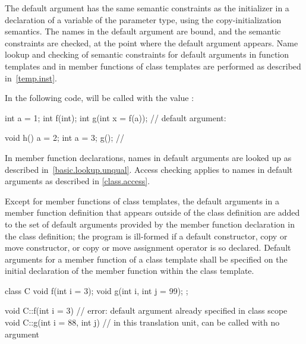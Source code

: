 \pnum
{}%
%
%
The default argument has the
same semantic constraints as the initializer in a
declaration of a variable of the parameter type, using the
copy-initialization semantics.
The names in the
default argument are bound, and the semantic constraints are checked,
at the point where the default argument appears.
Name lookup and checking of semantic constraints for default
arguments in function templates and in member functions of
class templates are performed as described in~\ref{temp.inst}.
\begin{example}
In the following code,
%
will be called with the value
:

\begin{codeblock}
int a = 1;
int f(int);
int g(int x = f(a));            // default argument: 

void h() {
  a = 2;
  {
  int a = 3;
  g();                          // 
  }
}
\end{codeblock}
\end{example}
\begin{note}
In member function declarations,
names in default arguments are looked up
as described in~\ref{basic.lookup.unqual}.
Access checking applies to names in default arguments as
described in \ref{class.access}.
\end{note}

\pnum
Except for member functions of class templates, the
default arguments in a member function definition that appears
outside of the class definition
are added to the set of default arguments provided by the
member function declaration in the class definition;
the program is ill-formed if a default constructor,
copy or move constructor, or
copy or move assignment operator
is so declared.
Default arguments for a member function of a class template
shall be specified on the initial declaration of the member
function within the class template.
\begin{example}
\begin{codeblock}
class C {
  void f(int i = 3);
  void g(int i, int j = 99);
};

void C::f(int i = 3) {}         // error: default argument already specified in class scope
void C::g(int i = 88, int j) {} // in this translation unit,  can be called with no argument
\end{codeblock}
\end{example}

